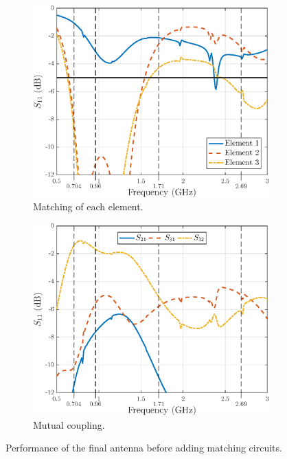 \begin{figure}[H]
    \centering
    \begin{subfigure}[b]{0.49\textwidth}
        \includegraphics[width=\textwidth]{img/main_final_res.eps}
        \caption{Matching of each element.}
        \label{fig:main_final_res}
    \end{subfigure}
    \begin{subfigure}[b]{0.49\textwidth}
        \includegraphics[width=\textwidth]{img/main_final_res_coup.eps}
        \caption{Mutual coupling.}
        \label{fig:main_final_res_coup}
    \end{subfigure}
    \caption{Performance of the final antenna before adding matching circuits.}
    \label{fig:main_res}
\end{figure}

